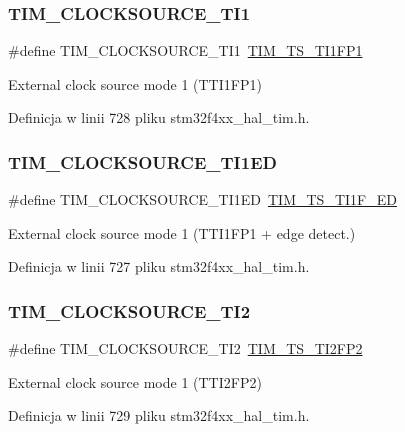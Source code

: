 \subsubsection{\texorpdfstring{T\+I\+M\+\_\+\+C\+L\+O\+C\+K\+S\+O\+U\+R\+C\+E\+\_\+\+T\+I1}{TIM\_CLOCKSOURCE\_TI1}}
{\footnotesize\ttfamily \#define T\+I\+M\+\_\+\+C\+L\+O\+C\+K\+S\+O\+U\+R\+C\+E\+\_\+\+T\+I1~\hyperlink{group___t_i_m___trigger___selection_ga38d3514d54bcdb0ea8ac8bd91c5832b5}{T\+I\+M\+\_\+\+T\+S\+\_\+\+T\+I1\+F\+P1}}

External clock source mode 1 (T\+T\+I1\+F\+P1) 

Definicja w linii 728 pliku stm32f4xx\+\_\+hal\+\_\+tim.\+h.

\mbox{\label{group___t_i_m___clock___source_gad8c96337acf40356d82570cc4851ce2d}} 
\subsubsection{\texorpdfstring{T\+I\+M\+\_\+\+C\+L\+O\+C\+K\+S\+O\+U\+R\+C\+E\+\_\+\+T\+I1\+ED}{TIM\_CLOCKSOURCE\_TI1ED}}
{\footnotesize\ttfamily \#define T\+I\+M\+\_\+\+C\+L\+O\+C\+K\+S\+O\+U\+R\+C\+E\+\_\+\+T\+I1\+ED~\hyperlink{group___t_i_m___trigger___selection_ga8c89554efc693e679c94b5a749af123c}{T\+I\+M\+\_\+\+T\+S\+\_\+\+T\+I1\+F\+\_\+\+ED}}

External clock source mode 1 (T\+T\+I1\+F\+P1 + edge detect.) 

Definicja w linii 727 pliku stm32f4xx\+\_\+hal\+\_\+tim.\+h.

\mbox{\label{group___t_i_m___clock___source_ga7950cf616702dd38d8f1ab5091efc012}} 
\subsubsection{\texorpdfstring{T\+I\+M\+\_\+\+C\+L\+O\+C\+K\+S\+O\+U\+R\+C\+E\+\_\+\+T\+I2}{TIM\_CLOCKSOURCE\_TI2}}
{\footnotesize\ttfamily \#define T\+I\+M\+\_\+\+C\+L\+O\+C\+K\+S\+O\+U\+R\+C\+E\+\_\+\+T\+I2~\hyperlink{group___t_i_m___trigger___selection_ga0ed58a269bccd3f22d19cc9a2ba3123f}{T\+I\+M\+\_\+\+T\+S\+\_\+\+T\+I2\+F\+P2}}

External clock source mode 1 (T\+T\+I2\+F\+P2) 

Definicja w linii 729 pliku stm32f4xx\+\_\+hal\+\_\+tim.\+h.

